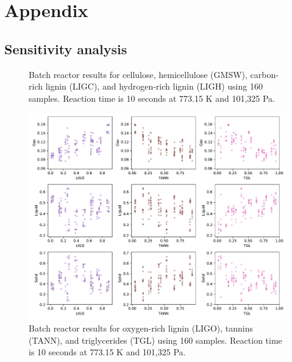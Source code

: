 
\appendix

\section{Appendix}

\subsection{Sensitivity analysis}

\begin{figure}[H]
    \centering
    \caption{Batch reactor results for cellulose, hemicellulose (GMSW), carbon-rich lignin (LIGC), and hydrogen-rich lignin (LIGH) using 160 samples. Reaction time is 10 seconds at 773.15 K and 101,325 Pa.}
\end{figure}

\begin{figure}[H]
    \centering
    \includegraphics[width=\textwidth]{figures/sa-scatter2-n10.pdf}
    \caption{Batch reactor results for oxygen-rich lignin (LIGO), tannins (TANN), and triglycerides (TGL) using 160 samples. Reaction time is 10 seconds at 773.15 K and 101,325 Pa.}
\end{figure}

